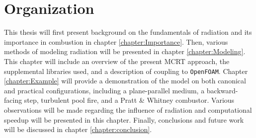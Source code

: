 \section{Organization}
This thesis will first present background on the fundamentals of radiation and its importance in combustion in chapter \ref{chapter:Importance}. 
Then, various methods of modeling radiation will be presented in chapter \ref{chapter:Modeling}.
This chapter will include an overview of the present MCRT approach, the supplemental libraries used, and a description of coupling to \verb|OpenFOAM|.
Chapter \ref{chapter:Example} will provide a demonstration of the model on both canonical and practical configurations, including a plane-parallel medium, a backward-facing step, turbulent pool fire, and a Pratt \& Whitney combustor. Various observations will be made regarding the influence of radiation and computational speedup will be presented in this chapter.
Finally, conclusions and future work will be discussed in chapter \ref{chapter:conclusion}.